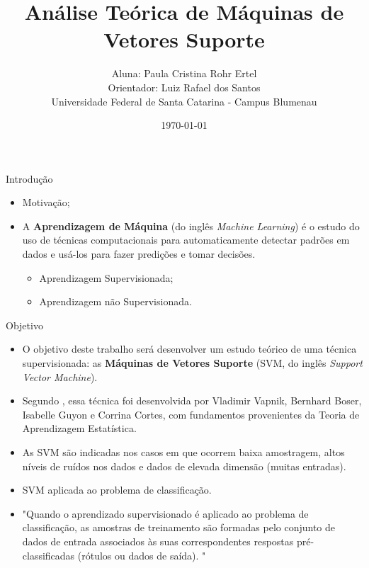 \documentclass[12pt]{beamer}
\title{Análise Teórica de Máquinas de Vetores Suporte}
\author{Aluna: Paula Cristina Rohr Ertel \\ Orientador: Luiz Rafael dos Santos \\ Universidade Federal de Santa Catarina - Campus Blumenau}
\date{\today}
\theoremstyle{definition}%
\begin{document}
\begin{frame}
	\maketitle
\end{frame}


\begin{frame}{Introdução}
\begin{itemize}
	\item Motivação;
	\item A \textbf{Aprendizagem de Máquina} (do inglês \textit{Machine Learning}) é o estudo do uso de técnicas computacionais para automaticamente detectar padrões em dados e usá-los para fazer predições e tomar decisões.
	\begin{itemize}
		\item Aprendizagem Supervisionada;
		\item Aprendizagem não Supervisionada.	
	\end{itemize}
\end{itemize}
\end{frame}

\begin{frame}{Objetivo}
\begin{itemize}
	\item O objetivo deste trabalho será desenvolver um estudo teórico de uma técnica supervisionada: as \textbf{Máquinas de Vetores Suporte} (SVM, do inglês \textit{Support Vector Machine}).

	\item Segundo \textcite{Evelin2017}, essa técnica foi desenvolvida por Vladimir Vapnik, Bernhard Boser, Isabelle Guyon e Corrina Cortes, com fundamentos provenientes da Teoria de Aprendizagem Estatística.
	
	\item As SVM são indicadas nos casos em que ocorrem baixa amostragem, altos níveis de ruídos nos dados e dados de elevada dimensão (muitas entradas).
	
	\item SVM aplicada ao problema de classificação.
	
	\item "Quando o aprendizado supervisionado é aplicado ao problema de classificação, as 
	amostras de treinamento são formadas pelo conjunto de dados de entrada associados 
	às suas correspondentes respostas pré-classificadas (rótulos ou dados de saída). " 
\end{itemize}
\end{frame}
\end{document}
